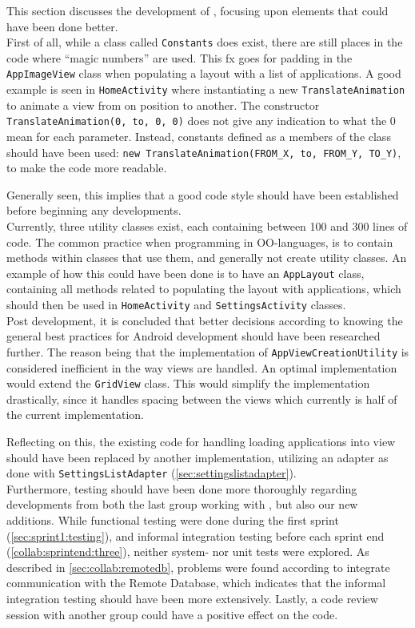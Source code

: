 This section discusses the development of \launcher, focusing upon elements that could have been done better.\\

First of all, while a class called \lstinline|Constants| does exist, there are still places in the code where ``magic numbers'' are used.
This fx goes for padding in the \lstinline|AppImageView| class when populating a layout with a list of applications.
A good example is seen in \lstinline|HomeActivity| where instantiating a new \lstinline|TranslateAnimation| to animate a view from on position to another.
The constructor \lstinline|TranslateAnimation(0, to, 0, 0)| does not give any indication to what the 0 mean for each parameter.
Instead, constants defined as a members of the class should have been used: \lstinline|new TranslateAnimation(FROM_X, to, FROM_Y, TO_Y)|, to make the code more readable.

Generally seen, this implies that a good code style should have been established before beginning any developments.
\\

Currently, three utility classes exist, each containing between 100 and 300 lines of code.
The common practice when programming in OO-languages, is to contain methods within classes that use them, and generally not create utility classes.
An example of how this could have been done is to have an \lstinline|AppLayout| class, containing all methods related to populating the layout with applications, which should then be used in \lstinline|HomeActivity| and \lstinline|SettingsActivity| classes.\\


Post development, it is concluded that better decisions according to knowing the general best practices for Android development should have been researched further.
The reason being that the implementation of \lstinline|AppViewCreationUtility| is considered inefficient in the way views are handled.
An optimal implementation would extend the \lstinline|GridView| class.
This would simplify the implementation drastically, since it handles spacing between the views which currently is half of the current implementation.

Reflecting on this, the existing code for handling loading applications into view should have been replaced by another implementation, utilizing an adapter as done with \lstinline|SettingsListAdapter| (\cref{sec:settingslistadapter}).\\

Furthermore, testing should have been done more thoroughly regarding developments from both the last group working with \launcher, but also our new additions.
While functional testing were done during the first sprint (\cref{sec:sprint1:testing}), and informal integration testing before each sprint end (\cref{collab:sprintend:three}), neither system- nor unit tests were explored.
As described in \cref{sec:collab:remotedb}, problems were found according to integrate communication with the Remote Database, which indicates that the informal integration testing should have been more extensively.
Lastly, a code review session with another group could have a positive effect on the code.